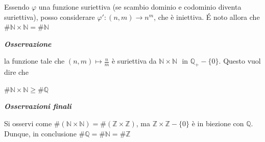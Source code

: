 \documentclass{article}
\theoremstyle{definition}
\begin{document}
\newpage
Essendo $\varphi$ una funzione suriettiva (se scambio dominio e codominio diventa suriettiva), posso considerare $\varphi': (n,m) \to n^m$, che è iniettiva. \'E noto allora che $\#\mathbb{N} \times \mathbb{N} = \#\mathbb{N}$
\begin{center}
    \textbf{\textit{Osservazione}}
\end{center}
la funzione tale che $(n,m) \mapsto \frac{n}{m}$ è suriettiva da $\mathbb{N} \times \mathbb{N} $ \,\,in $\mathbb{Q_+}-\{0\}$.
Questo vuol dire che 
\begin{center}
    $\#\mathbb{N} \times \mathbb{N} \geqslant \#\mathbb{Q}$
\end{center}

\begin{center}
    \textbf{\textit{Osservazioni finali}}
\end{center}
Si osservi come $\#(\mathbb{N} \times \mathbb{N})=\#(\mathbb{Z} \times \mathbb{Z})$, ma $\mathbb{Z} \times \mathbb{Z}-\{0\}$ è in biezione con $\mathbb{Q}$.
\\ Dunque, in conclusione
$\#\mathbb{Q}=\#\mathbb{N}=\#\mathbb{Z}$
\end{document}
